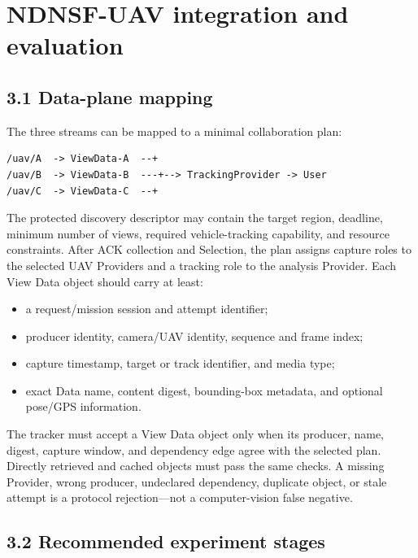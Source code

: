 \documentclass[10pt,a4paper]{article}
\begin{document}
\clearpage
\section{NDNSF-UAV integration and evaluation}

\subsection*{3.1 Data-plane mapping}

The three streams can be mapped to a minimal collaboration plan:

\begin{verbatim}
/uav/A  -> ViewData-A  --+
/uav/B  -> ViewData-B  ---+--> TrackingProvider -> User
/uav/C  -> ViewData-C  --+
\end{verbatim}

The protected discovery descriptor may contain the target region, deadline,
minimum number of views, required vehicle-tracking capability, and resource
constraints. After ACK collection and Selection, the plan assigns capture
roles to the selected UAV Providers and a tracking role to the analysis
Provider. Each View Data object should carry at least:

\begin{itemize}
  \item a request/mission session and attempt identifier;
  \item producer identity, camera/UAV identity, sequence and frame index;
  \item capture timestamp, target or track identifier, and media type;
  \item exact Data name, content digest, bounding-box metadata, and optional
        pose/GPS information.
\end{itemize}

The tracker must accept a View Data object only when its producer, name, digest,
capture window, and dependency edge agree with the selected plan. Directly
retrieved and cached objects must pass the same checks. A missing Provider,
wrong producer, undeclared dependency, duplicate object, or stale attempt is a
protocol rejection—not a computer-vision false negative.

\subsection*{3.2 Recommended experiment stages}
\end{document}
